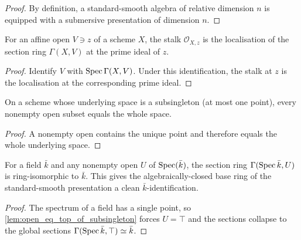 \begin{proof}
  By definition, a standard-smooth algebra of relative dimension \(n\)
  is equipped with a submersive presentation of dimension \(n\).
\end{proof}

\begin{lemma}\leanok
  \label{lem:isLocalization_atPrime_stalk_of_affineOpen}
  For an affine open \(V \ni z\) of a scheme \(X\), the stalk \(\mathcal O_{X,z}\) is
  the localisation of the section ring \(\Gamma(X, V)\) at the prime ideal of \(z\).
\end{lemma}

\begin{proof}
  Identify \(V\) with \(\operatorname{Spec}\Gamma(X,V)\).  Under this identification,
  the stalk at \(z\) is the localisation at the corresponding prime ideal.
\end{proof}

\begin{lemma}\leanok
  \label{lem:open_eq_top_of_subsingleton}
  On a scheme whose underlying space is a subsingleton (at most one point), every
  nonempty open subset equals the whole space.
\end{lemma}

\begin{proof}
  A nonempty open contains the unique point and therefore equals the
  whole underlying space.
\end{proof}

\begin{lemma}\leanok
  \label{lem:gammaSpecField_ringEquiv}
  For a field \(\bar k\) and any nonempty open \(U\) of \(\operatorname{Spec}(\bar k)\), the section
  ring \(\Gamma(\operatorname{Spec} \bar k, U)\) is ring-isomorphic to \(\bar k\). This gives the
  algebraically-closed base ring of the standard-smooth presentation a clean
  \(\bar k\)-identification.
\end{lemma}

\begin{proof}
  The spectrum of a field has a single point, so
  \cref{lem:open_eq_top_of_subsingleton} forces \(U = \top\) and the sections collapse
  to the global sections \(\Gamma(\operatorname{Spec} \bar k, \top) \simeq \bar k\).
\end{proof}

